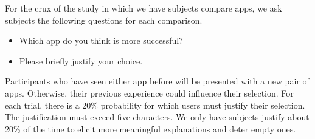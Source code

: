 For the crux of the study in which we have subjects compare apps, we ask subjects the following questions for each comparison.

\begin{itemize}
\item Which app do you think is more successful?
\item Please briefly justify your choice.
\end{itemize}
  
Participants who have seen either app before will be presented with a new pair of apps. Otherwise, their previous experience could influence their selection. For each trial, there is a 20\% probability for which users must justify their selection. The justification must exceed five characters. We only have subjects justify about 20\% of the time to elicit more meaningful explanations and deter empty ones.